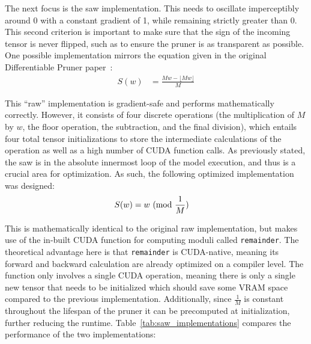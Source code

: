 The next focus is the saw implementation. This needs to oscillate imperceptibly around 0 with a constant gradient of 1,
while remaining strictly greater than 0. This second criterion is important to make sure that the sign of the incoming tensor
is never flipped, such as to ensure the pruner is as transparent as possible. One possible implementation mirrors the equation
given in the original Differentiable Pruner paper~\citep{kim2019v1}:
\begin{align}
	S(w) &= \frac{M w - \lfloor M w \rfloor}{M} \label{eq:rawsaw}
\end{align}

This ``raw'' implementation is gradient-safe and performs mathematically correctly. However, it consists of four discrete operations
(the multiplication of $M$ by $w$, the floor operation, the subtraction, and the final division), which entails four total
tensor initializations to store the intermediate calculations of the operation as well as a high number of CUDA function calls.
As previously stated, the saw is in the absolute innermost loop of the model execution, and thus is a crucial area for optimization.
As such, the following optimized implementation was designed:
\begin{align}
	S(w) &= w\ (\mathrm{mod}\ \frac{1}{M}) \label{eq:optsaw}
\end{align}

This is mathematically identical to the original raw implementation, but makes use of the in-built CUDA function for computing
moduli called \texttt{remainder}. The theoretical advantage here is that \texttt{remainder} is CUDA-native, meaning its forward
and backward calculation are already optimized on a compiler level. The function only involves a single CUDA operation,
meaning there is only a single new tensor that needs to be initialized which should save some VRAM space compared to the
previous implementation. Additionally, since $\frac{1}{M}$ is constant throughout the lifespan of the pruner it
can be precomputed at initialization, further reducing the runtime. Table~\ref{tab:saw_implementations}
compares the performance of the two implementations:

